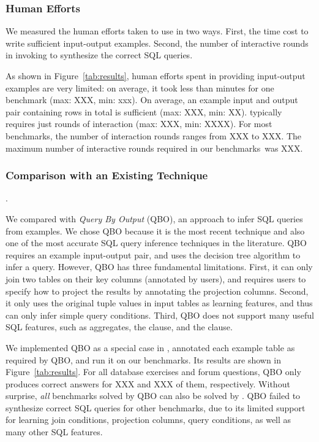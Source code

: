 


\subsubsection{Human Efforts}
\label{sec:human}

We measured the human efforts taken to use \ourtool in two ways.
First, the time cost to write sufficient input-output examples. Second,
the number of interactive rounds in invoking \ourtool
to synthesize the correct SQL queries.

As shown in Figure~\ref{tab:results}, human efforts
spent in providing input-output examples are very limited:
on average, it took less than \avghum minutes for one benchmark
(max: XXX, min: xxx).
On average, an example input and output pair containing \avgtuple
rows in total is sufficient (max: XXX, min: XX).
\ourtool typically requires just \avground rounds of
interaction (max: XXX, min: XXXX). For most benchmarks, the number of interaction
rounds ranges from XXX to XXX.
The maximum number
of interactive rounds required in our benchmarks\
was XXX. 


\subsubsection{Comparison with an Existing Technique}.
\label{sec:comparison}

We compared \ourtool with \textit{Query By Output} (QBO), an
approach to infer SQL queries~\cite{Tran:2009} from examples.
We chose QBO because it is the most recent technique and also one
of the most accurate SQL query inference techniques in
the literature. QBO requires an example input-output pair, and
uses the decision tree algorithm to infer a query.
However, QBO has three fundamental limitations. First, 
it can only join two tables on their key columns (annotated by users), and requires
users to specify how to project the results
by annotating the projection columns.
Second, it only uses the original tuple values
in input tables as learning features, and thus can only
infer simple query conditions. Third, QBO does not support
many useful SQL features, such as aggregates, the 
clause, and the \CodeIn{HAVING} clause.

We implemented QBO as a special case in \ourtool, annotated
each example table as required by QBO, and run it
on our benchmarks. Its results are shown in Figure~\ref{tab:results}.
For all \exnum database exercises
and \pnum forum questions, QBO only produces correct answers
for XXX and XXX of them, respectively.
Without surprise, \textit{all}
benchmarks solved by QBO can also be solved by \ourtool.
QBO failed to synthesize correct SQL queries for other benchmarks, due
to its limited support for learning join conditions,
projection columns, query conditions, as well as many other SQL features.

